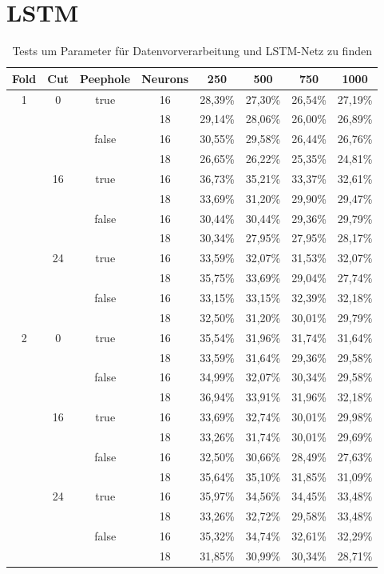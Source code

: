\section{\ac{LSTM}}
\begin{table*}[htbp]
\centering
\begin{tabular}{|c|c|c|c|c|c|c|c|}
\hline
 Fold 		& Cut & Peephole & Neurons & 250 & 500 & 750 & 1000 \\
 \hline
 \multirow{12}{*}{1}&\multirow{4}{*}{0}&\multirow{2}{*}{true}&16&28,39\%&27,30\%&26,54\%&27,19\%\\
  & & &18&29,14\%&28,06\%&26,00\%&26,89\%\\
  & &\multirow{2}{*}{false}&16&30,55\%&29,58\%&26,44\%&26,76\%\\
  & & &18&26,65\%&26,22\%&25,35\%&24,81\%\\
  \hline
  &\multirow{4}{*}{16}&\multirow{2}{*}{true}&16&36,73\%&35,21\%&33,37\%&32,61\%\\
  & & &18&33,69\%&31,20\%&29,90\%&29,47\%\\
  & &\multirow{2}{*}{false}&16&30,44\%&30,44\%&29,36\%&29,79\%\\
  & & &18&30,34\%&27,95\%&27,95\%&28,17\%\\
  \hline
  &\multirow{4}{*}{24}&\multirow{2}{*}{true}&16&33,59\%&32,07\%&31,53\%&32,07\%\\
  & & &18&35,75\%&33,69\%&29,04\%&27,74\%\\
  & &\multirow{2}{*}{false}&16&33,15\%&33,15\%&32,39\%&32,18\%\\
  & & &18&32,50\%&31,20\%&30,01\%&29,79\%\\
  \hline
  \multirow{12}{*}{2}&\multirow{4}{*}{0}&\multirow{2}{*}{true}&16&35,54\%&31,96\%&31,74\%&31,64\%\\
  & & &18&33,59\%&31,64\%&29,36\%&29,58\%\\
  & &\multirow{2}{*}{false}&16&34,99\%&32,07\%&30,34\%&29,58\%\\
  & & &18&36,94\%&33,91\%&31,96\%&32,18\%\\
  \hline
  &\multirow{4}{*}{16}&\multirow{2}{*}{true}&16&33,69\%&32,74\%&30,01\%&29,98\%\\
  & & &18&33,26\%&31,74\%&30,01\%&29,69\%\\
  & &\multirow{2}{*}{false}&16&32,50\%&30,66\%&28,49\%&27,63\%\\
  & & &18&35,64\%&35,10\%&31,85\%&31,09\%\\
  \hline
  &\multirow{4}{*}{24}&\multirow{2}{*}{true}&16&35,97\%&34,56\%&34,45\%&33,48\%\\
  & & &18&33,26\%&32,72\%&29,58\%&33,48\%\\
  & &\multirow{2}{*}{false}&16&35,32\%&34,74\%&32,61\%&32,29\%\\
  & & &18&31,85\%&30,99\%&30,34\%&28,71\%\\
\hline
\end{tabular} 
\caption[Tests für Daten und LSTM-Netz]{Tests um Parameter für Datenvorverarbeitung und LSTM-Netz zu finden}
\label{tab:inputtests}
\end{table*}